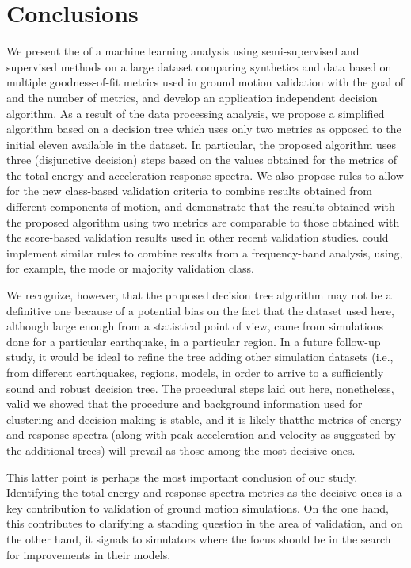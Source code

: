 
\section{Conclusions}

We present the  of a machine learning analysis using semi-supervised and supervised methods on a large dataset comparing synthetics and data based on multiple goodness-of-fit metrics used in ground motion validation with the goal of  and  the number of metrics, and develop an application independent decision algorithm. As a result of the data processing analysis, we propose a simplified algorithm based on a decision tree which uses only two metrics as opposed to the initial eleven available in the dataset. In particular, the proposed algorithm uses three (disjunctive decision) steps based on the values obtained for the metrics of the total energy and acceleration response spectra. We also propose rules to allow for the new class-based validation criteria to combine results obtained from different components of motion, and demonstrate that the results obtained with the proposed algorithm using two metrics are comparable to those obtained with the score-based validation results used in other recent validation studies.  could implement similar rules to combine results from a frequency-band analysis, using, for example, the mode or majority validation class. 

We recognize, however, that the proposed decision tree algorithm may not be a definitive one because of a potential bias on the fact that the dataset used here, although large enough from a statistical point of view, came from simulations done for a particular earthquake, in a particular region. In a future follow-up study, it would be ideal to refine the tree adding other simulation datasets (i.e., from different earthquakes, regions, models,  in order to arrive to a sufficiently sound and robust decision tree. The procedural steps laid out here, nonetheless,  valid we showed that the procedure and background information used for clustering and decision making is stable, and it is likely thatthe metrics of energy and response spectra (along with peak acceleration and velocity as suggested by the additional trees) will prevail as those among the most decisive ones.

This latter point is perhaps the most important conclusion of our study. Identifying the total energy and response spectra metrics as the decisive ones is a key contribution to validation of ground motion simulations. On the one hand, this contributes to clarifying a standing question in the area of validation, and on the other hand, it signals to simulators where the focus should be in the search for improvements in their models.
